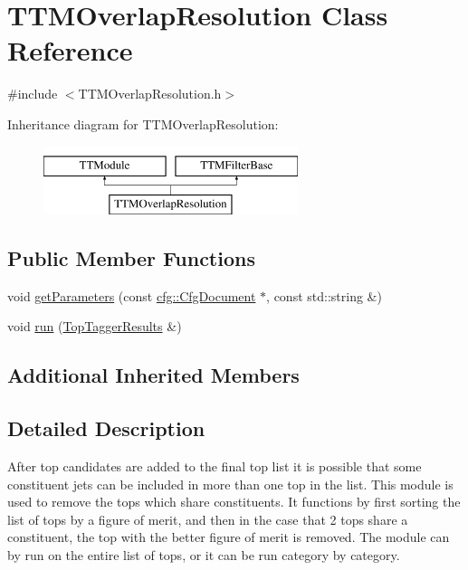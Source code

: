 \hypertarget{classTTMOverlapResolution}{\section{T\-T\-M\-Overlap\-Resolution Class Reference}
\label{classTTMOverlapResolution}
}


{\ttfamily \#include $<$T\-T\-M\-Overlap\-Resolution.\-h$>$}

Inheritance diagram for T\-T\-M\-Overlap\-Resolution\-:\begin{figure}[H]
\begin{center}
\leavevmode
\includegraphics[height=2.000000cm]{classTTMOverlapResolution}
\end{center}
\end{figure}
\subsection*{Public Member Functions}
\begin{DoxyCompactItemize}
\item 
void \hyperlink{classTTMOverlapResolution_a4dd88bd8480301018cfba596ae226157}{get\-Parameters} (const \hyperlink{classcfg_1_1CfgDocument}{cfg\-::\-Cfg\-Document} $\ast$, const std\-::string \&)
\item 
void \hyperlink{classTTMOverlapResolution_a4099ee72e105acbcca10078068775bef}{run} (\hyperlink{classTopTaggerResults}{Top\-Tagger\-Results} \&)
\end{DoxyCompactItemize}
\subsection*{Additional Inherited Members}


\subsection{Detailed Description}
After top candidates are added to the final top list it is possible that some constituent jets can be included in more than one top in the list. This module is used to remove the tops which share constituents. It functions by first sorting the list of tops by a figure of merit, and then in the case that 2 tops share a constituent, the top with the better figure of merit is removed. The module can by run on the entire list of tops, or it can be run category by category.


